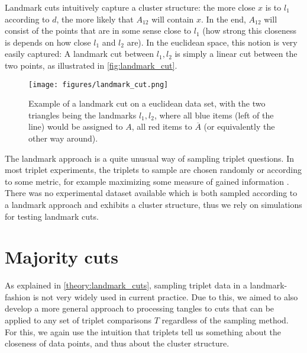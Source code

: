 Landmark cuts intuitively capture a cluster structure: the more close $x$ is to $l_1$ according to $d$, the more likely that $A_{12}$ will contain $x$. In the end, $A_{12}$ will
consist of the points that are in some sense close to $l_1$ (how strong this closeness is depends on how close $l_1$ and $l_2$ are). 
In the euclidean space, this notion is very easily captured: A landmark cut between $l_1, l_2$ is
simply a linear cut between the two points, as illustrated in \autoref{fig:landmark_cut}.

    \begin{figure}[ht]
        \centering
        \texttt{[image: figures/landmark\_cut.png]}
        \caption{Example of a landmark cut on a euclidean data set, with the two triangles being the landmarks $l_1, l_2$, where all blue items (left of the line) 
        would be assigned to $A$, all red items to $\overline{A}$ (or equivalently the other way around).}
        \label{fig:landmark_cut}
    \end{figure}

The landmark approach is a quite unusual way of sampling triplet questions.
In most triplet experiments, the triplets to sample are chosen randomly \citep{kleindessnerLensDepthFunction2017, haghiriEstimationPerceptualScales2020} 
or according to some metric, for example maximizing some measure of gained information \citep{roadsEnrichingImageNetHuman2021}. 
There was no experimental dataset available which is both sampled according to a landmark approach and exhibits a cluster structure, thus we rely on simulations
for testing landmark cuts.

\section{Majority cuts}\label{theory:majority_cuts}
As explained in \autoref{theory:landmark_cuts}, sampling triplet data in a landmark-fashion is not very widely used in current practice. Due to this, we aimed
to also develop a more general approach to processing tangles to cuts that can be applied to any set of triplet comparisons $T$ regardless of the sampling method.
For this, we again use the intuition that triplets tell us something about the closeness of data points, and thus about the cluster structure. 

